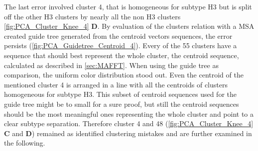 The last error involved cluster 4, that is homogeneous for subtype H3 but is split off the other H3 clusters by nearly all the non H3 clusters \autoref{fig:PCA_Cluster_Knee_4} \textbf{\textsf{D}}. By evaluation of the clusters relation with a \gls{MSA} created guide tree generated from the centroid vectors sequences, the error persists (\autoref{fig:PCA_Guidetree_Centroid_4}). Every of the 55 clusters have a sequence that should best represent the whole cluster, the centroid sequence, calculated as described in \autoref{sec:MAFFT}. When using the guide tree as comparison, the uniform color distribution stood out. Even the centroid of the mentioned cluster 4 is arranged in a line with all the centroids of clusters homogeneous for subtype H3. This subset of centroid sequences used for the guide tree might be to small for a sure proof, but still the centroid sequences should be the most meaningful ones representing the whole cluster and point to a clear subtype separation. Therefore cluster 4 and 48 (\autoref{fig:PCA_Cluster_Knee_4} \textbf{\textsf{C}} and \textbf{\textsf{D}}) remained as identified clustering mistakes and are further examined in the following.

